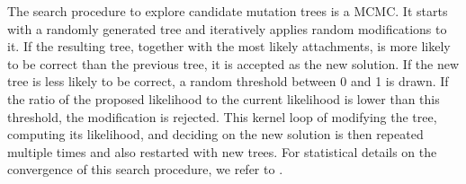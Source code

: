 The search procedure to explore candidate mutation trees is a \acf{MCMC}.
It starts with a randomly generated tree and iteratively applies random modifications to it. If the resulting tree, together with the most likely attachments, is more likely to be correct than the previous tree, it is accepted as the new solution. If the new tree is less likely to be correct, a random threshold between 0 and 1 is drawn. If the ratio of the proposed likelihood to the current likelihood is lower than this threshold, the modification is rejected. This kernel loop of modifying the tree, computing its likelihood, and deciding on the new solution is then repeated multiple times and also restarted with new trees. For statistical details on the convergence of this search procedure, we refer to \citeauthor{tree2016} \cite{tree2016}. %

